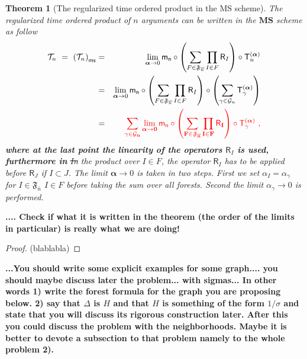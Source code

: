 \documentclass[11pt]{book}
\newcommand{\com}[1]{{\color{red}\bf #1}}
\newcommand{\sbar}[1]{\sout{\color{red} #1}}
\newcommand{\ms}{\mathsf{ms}}
\newcommand{\MS}{\textbf{MS}}
\newcommand{\alphabd}{\boldsymbol{\alpha}}
\newcommand{\Gcal}{\mathcal{G}}
\newcommand{\Tcal}{\mathcal{T}}
\newcommand{\Frak}{\mathfrak{F}}
\newcommand{\Rsf}{\mathsf{R}}
\newcommand{\Tsf}{\mathsf{T}}
\newcommand{\msf}{\mathsf{m}}
\newcommand{\nsf}{\mathsf{n}}
\theoremstyle{break}
\newtheorem{theorem}{Theorem}[chapter]
\begin{document}
\begin{theorem}[The regularized time ordered product in the MS scheme] \label{theo:renorm_t_prod_ms_forest}
The regularized time ordered product of $n$ arguments can be written in the $\MS$ scheme as follow
%
\begin{eqnarray}
\Tcal_n \ = \ \left(\Tcal_n\right)_\ms &=& \lim_{\alphabd \to 0} \msf_\nsf \circ \left( \sum_{F\in\Frak_{\overline{n}}} \prod_{I\in F} \Rsf_I \right) \circ \Tsf^{(\alphabd)}_n \nonumber \\
&=& \lim_{\alphabd \to 0} \msf_\nsf \circ \left( \sum_{F\in\Frak_{\overline{n}}} \prod_{I\in F} \Rsf_I \right) \circ \left( \sum_{\gamma\in\Gcal_n} \Tsf_{\gamma}^{(\alphabd)} \right)  \nonumber \\
&=& \com{ \sum_{\gamma\in\Gcal_n} \lim_{\alphabd \to 0} \msf_\nsf \circ \left( \sum_{F\in\Frak_{\overline{n}}} \prod_{I\in F} \Rsf_I \right) \circ  \Tsf_{\gamma}^{(\alphabd)} \ ,}
\label{eq:ms_t_forest}
\end{eqnarray}
%
\com{where at the last point the linearity of the operators $\Rsf_I$ is used, furthermore in}
\sbar{In} the product over $I\in F$, the operator $\Rsf_I$ has to be applied before $\Rsf_J$ if $I\subset J$.
%
The limit $\alphabd \to 0$ is taken in two steps. First we set $\alpha_{I}= \alpha_\gamma$ for \sbar{$I \in \Frak_{\bar{n}}$} \com{$I \in F$} before taking the sum over all forests. Second the limit $\alpha_\gamma \to 0$ is performed.
\end{theorem}
\com{ .... Check if what it is written in the theorem (the order of the limits in particular) is really what we are doing!}

\begin{proof}
(blablabla)
\end{proof}
\com{...You should write some explicit examples for some graph....    you should maybe discuss later the problem... with sigmas... In other words 1) write the forest formula for the graph you are proposing below. 2) say that $\Delta$ is $H$ and that $H$ is something of the form $1/\sigma$ and state that you will discuss its rigorous construction later. After this you could discuss the problem with the neighborhoods. Maybe it is better to devote a subsection to that problem namely to the whole problem 2).}
\end{document}
